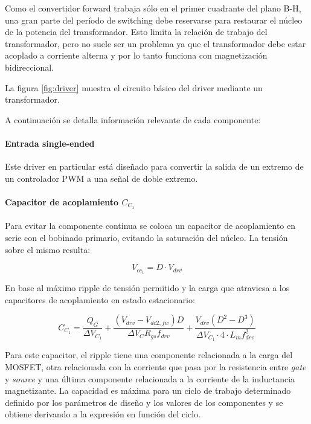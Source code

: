 Como el convertidor forward trabaja sólo en el primer cuadrante del plano B-H, una gran parte del período de switching debe reservarse para restaurar el núcleo de la potencia del transformador. 
Esto limita la relación de trabajo del transformador, pero no suele ser un problema ya que 
el transformador debe estar acoplado a corriente alterna y por lo tanto funciona con magnetización bidireccional. 

La figura \ref{fig:driver} muestra el circuito básico del driver mediante un transformador.

A continuación se detalla información relevante de cada componente: 

\paragraph{Entrada single-ended} 

Este driver en particular está diseñado para convertir la salida de un extremo de un controlador PWM a una señal de doble extremo. %

\paragraph{Capacitor de acoplamiento $C_{C_1}$}

Para evitar la componente continua se coloca un capacitor de acoplamiento en serie con el bobinado primario, 
evitando la saturación del núcleo. La tensión sobre el mismo resulta: 

$$ V_{cc_1}=D\cdot V_{drv} $$

En base al máximo ripple de tensión permitido y la carga que atraviesa a los capacitores de acoplamiento en estado estacionario:

$$ C_{C_1}=\frac{Q_G}{\Delta V_{C_1}}+\frac{(V_{drv}-V_{dc2,fw})D}{\Delta V_CR_{gs}f_{drv}}+\frac{V_{drv}(D^2-D^3)}{\Delta V_{C_1}\cdot4\cdot L_mf_{drv}^2} $$

Para este capacitor, el ripple tiene una componente relacionada a la carga del MOSFET, 
otra relacionada con la corriente que pasa por la resistencia entre \textit{gate} y \textit{source} 
y una última componente relacionada a la corriente de la inductancia magnetizante. 
La capacidad es máxima para un ciclo de trabajo determinado definido por los parámetros de diseño 
y los valores de los componentes y se obtiene derivando a la expresión en función del ciclo. 

